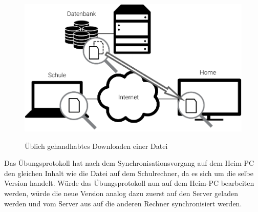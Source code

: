 \begin{figure}[htb]
	\centering
  \includegraphics[]{images/dropbox_download}
	\label{dropbox_download}
  \caption{Üblich gehandhabtes Downloaden einer Datei}
\end{figure}

Das Übungsprotokoll hat nach dem Synchronisationsvorgang auf dem Heim-PC
den gleichen Inhalt wie die Datei auf dem Schulrechner, da es sich um die selbe Version
handelt. Würde das Übungsprotokoll nun auf dem Heim-PC bearbeiten werden, würde
die neue Version analog dazu zuerst auf den Server geladen werden und vom Server
aus auf die anderen Rechner synchronisiert werden.
